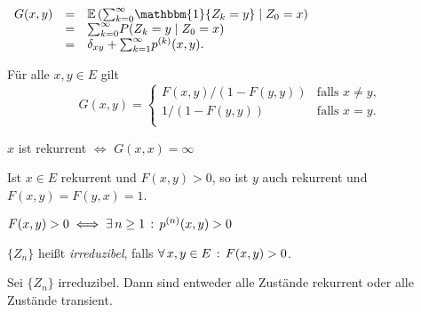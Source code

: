\documentclass{cheat-sheet}
\newcommand{\E}{\mathbb{E}} %
\newcommand{\ind}{\mathbbm{1}} %
\begin{document}
\begin{bem}
  $
    \begin{array}[t]{r c l}
      G(x, y) &=& \E \left( {\sum}_{k=0}^\infty \ind \{ Z_k = y \} \mid Z_0 = x \right) \\
      &=& {\sum}_{k=0}^\infty P(Z_k = y \mid Z_0 = x) \\
      &=& \delta_{xy} + {\sum}_{k=1}^\infty p^{(k)}(x, y).
    \end{array}
  $
\end{bem}

\begin{satz}
  Für alle $x, y \in E$ gilt
  \[
    G(x, y) =
    \begin{cases}
      F(x, y)/(1 - F(y, y)) & \text{falls $x \neq y$}, \\
      1/(1 - F(y, y)) & \text{falls $x = y$}. \\
    \end{cases}
  \]
\end{satz}

\begin{kor}
  $x$ ist rekurrent $\iff$ $G(x, x) = \infty$
\end{kor}

\begin{satz}
  Ist $x \in E$ rekurrent und $F(x, y) > 0$, so ist $y$ auch rekurrent und $F(x, y) = F(y, x) = 1$.
\end{satz}

\iffalse
\begin{interp}
  $F(x, y) > 0$ bedeutet, dass nach jedem Besuch in~$x$ der Zustand $y$ auch besucht wird mit positiver Wahrscheinlichkeit und die Rekurrenz von~$x$ bedeutet, dass $x$ unendlich oft besucht wird.
  Der Satz sagt, dass dann auch $y$ unendlich oft besucht wird.
\end{interp}
\fi

\begin{bem}
  $F(x, y) > 0 \iff \exists \, {n \geq 1} \,:\, p^{(n)}(x, y) > 0$
\end{bem}

\begin{defn}
  $\{ Z_n \}$ heißt \emph{irreduzibel}, falls $\forall \, {x, y \in E} \,:\, F(x, y) > 0$.
\end{defn}

\begin{satz}
  Sei $\{ Z_n \}$ irreduzibel.
  Dann sind entweder alle Zustände rekurrent oder alle Zustände transient.
\end{satz}
\end{document}
